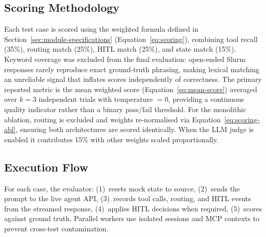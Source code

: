 \subsection{Scoring Methodology}

Each test case is scored using the weighted formula defined in Section~\ref{sec:module-specifications} (Equation~\ref{eq:scoring}), combining tool recall (35\%), routing match (25\%), HITL match (25\%), and state match (15\%). Keyword coverage was excluded from the final evaluation: open-ended Slurm responses rarely reproduce exact ground-truth phrasing, making lexical matching an unreliable signal that inflates scores independently of correctness. The primary reported metric is the mean weighted score (Equation~\ref{eq:mean-score}) averaged over $k=3$ independent trials with temperature $= 0$, providing a continuous quality indicator rather than a binary pass/fail threshold. For the monolithic ablation, routing is excluded and weights re-normalised via Equation~\ref{eq:scoring-abl}, ensuring both architectures are scored identically. When the LLM judge is enabled it contributes 15\% with other weights scaled proportionally.

\subsection{Execution Flow}

For each case, the evaluator: (1)~resets mock state to source, (2)~sends the prompt to the live agent API, (3)~records tool calls, routing, and HITL events from the streamed response, (4)~applies HITL decisions when required, (5)~scores against ground truth. Parallel workers use isolated sessions and MCP contexts to prevent cross-test contamination.
